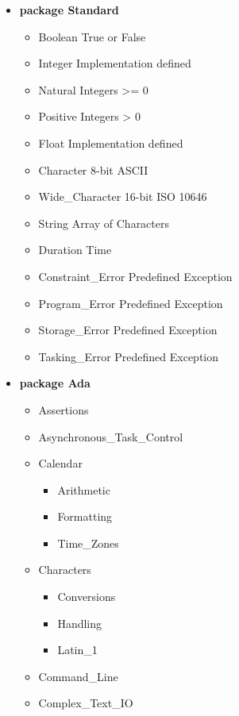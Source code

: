 \documentclass[english]{article}
\begin{document}
\begin{scriptsize}
\begin{multicols*}{5}
\begin{itemize}[leftmargin=0mm]
\item[] \textbf{package Standard}
   \begin{itemize}[leftmargin=5mm]
      \item[] Boolean True or False
      \item[] Integer Implementation defined
      \item[] Natural Integers >= 0
      \item[] Positive Integers > 0
      \item[] Float Implementation defined
      \item[] Character 8-bit ASCII
      \item[] Wide\_Character 16-bit ISO 10646
      \item[] String Array of Characters
      \item[] Duration Time
      \item[] Constraint\_Error Predefined Exception
      \item[] Program\_Error Predefined Exception
      \item[] Storage\_Error Predefined Exception
      \item[] Tasking\_Error Predefined Exception
   \end{itemize}
\item[] \textbf{package Ada}
   \begin{itemize}[leftmargin=5mm]
      \item[] Assertions
      \item[] Asynchronous\_Task\_Control
      \item[] Calendar
         \begin{itemize}[leftmargin=5mm]
            \item[] Arithmetic
            \item[] Formatting
            \item[] Time\_Zones
         \end{itemize}
      \item[] Characters
         \begin{itemize}[leftmargin=5mm]
            \item[] Conversions
            \item[] Handling
            \item[] Latin\_1
         \end{itemize}
      \item[] Command\_Line
      \item[] Complex\_Text\_IO

\end{itemize}
\end{itemize}
\end{multicols*}
\end{scriptsize}
\end{document}
